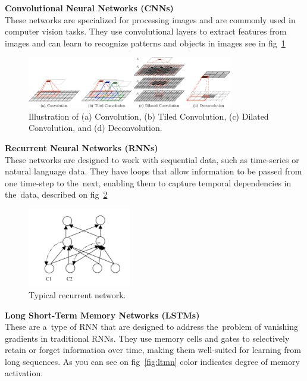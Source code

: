     \textbf{Convolutional Neural Networks (CNNs)}\\
    These networks are specialized for processing images and are commonly used in computer vision tasks. They use convolutional layers to extract features from images and can learn to recognize patterns and objects in images see in fig~\ref{fig:cn}
    \begin{center}
        \begin{figure}[!ht]
            \centering
            \includegraphics[width=0.8\textwidth]{figures/cn}
            \caption{Illustration of (a) Convolution, (b) Tiled Convolution, (c) Dilated Convolution, and (d)
                Deconvolution. \cite{GU2018354}}
            \label{fig:cn}
        \end{figure}
    \end{center}
    \textbf{Recurrent Neural Networks (RNNs)}\\
    These networks are designed to work with sequential data, such as time-series or natural language data. They have loops that allow information to be passed from one time-step to the~next, enabling them to capture temporal dependencies in the~data, described on fig~\ref{fig:rn}
    \begin{center}
        \begin{figure}[!ht]
            \centering
            \includegraphics[width=0.4\textwidth]{figures/rn}
            \caption{Typical recurrent network. \cite{medsker2001recurrent}}
            \label{fig:rn}
        \end{figure}
    \end{center}
    \textbf{Long Short-Term Memory Networks (LSTMs)}\\
    These are a~type of RNN that are designed to address the~problem of vanishing gradients in traditional RNNs. They use memory cells and gates to selectively retain or forget information over time, making them well-suited for learning from long sequences. As you can see on fig~\ref{fig:ltmn} color indicates degree of memory activation.
